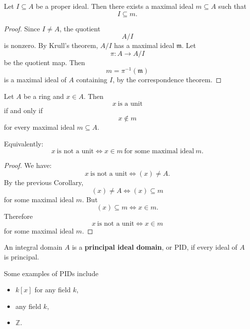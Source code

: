 \begin{cor}
    Let $I \subseteq A$ be a proper ideal. 
    Then there exists a maximal ideal $m \subseteq A$ such 
    that 
    \[
        I \subseteq m. 
    \]
\end{cor}
\begin{proof}
    Since $I \neq A$, the quotient 
    \[
        A/I
    \]
    is nonzero. By Krull's theorem, $A/I$ has a maximal ideal 
    $\mathfrak m$. 
    Let 
    \[
        \pi : A \to A/I   
    \]
    be the quotient map. Then 
    \[
        m = \pi^{-1}(\mathfrak m)
    \]
    is a maximal ideal of $A$ containing $I$, by 
    the correspondence theorem. 
\end{proof}
\begin{cor}
    Let $A$ be a ring and $x \in A$. Then 
    \[
        x \ \text{is a unit}
    \]
    if and only if 
    \[
        x \not\in m
    \]
    for every maximal ideal $m \subseteq A$. 

    Equivalently: 
    \[
        x \ \text{is not a unit} 
        \Leftrightarrow x \in m \ \text{for some maximal ideal} \ 
        m. 
    \]
\end{cor}
\begin{proof}
    We have: 
    \[
        x \ \text{is not a unit} \Leftrightarrow 
        (x) \neq A. 
    \]
    By the previous Corollary, 
    \[
        (x) \neq A \Leftrightarrow (x) \subseteq m
    \]
    for some maximal ideal $m$. 
    But 
    \[
        (x) \subseteq m \Leftrightarrow x \in m. 
    \]
    Therefore 
    \[
        x \ \text{is not a unit} 
        \Leftrightarrow x \in m
    \]
    for some maximal ideal $m$. 
\end{proof}

\begin{defn}[PID]
    An integral domain $A$ is a 
    \textbf{principal ideal domain}, or PID, if every ideal 
    of $A$ is principal. 
\end{defn}
\begin{ex}
    Some examples of PIDs include 
    \begin{itemize}
        \item $k[x]$ for any field $k$, 
        \item any field $k$, 
        \item $\mathbb Z$. 
    \end{itemize}
\end{ex}

